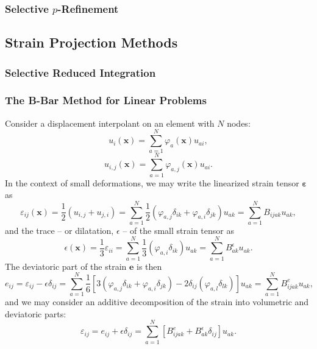 \documentclass[12pt]{book}
\begin{document}
\subsubsection{Selective $p$-Refinement}

\subsection{Strain Projection Methods}
\subsubsection{Selective Reduced Integration}
\subsubsection{The B-Bar Method for Linear Problems}

Consider a displacement interpolant on an element with $N$ nodes:
\begin{equation}
  u_i (\mathbf{x}) = \sum_{a = 1}^N \varphi_a (\mathbf{x}) u_{ai},
\end{equation}
\begin{equation}
  u_{i,j} (\mathbf{x}) = \sum_{a = 1}^N \varphi_{a,j} (\mathbf{x}) u_{ai}.
\end{equation}
In the context of small deformations, we may write the linearized strain tensor $\boldsymbol{\varepsilon}$ as
\begin{equation}
  \varepsilon_{ij} (\mathbf{x}) = \frac{1}{2} (u_{i,j} + u_{j,i}) = \sum_{a = 1}^N \frac{1}{2} (\varphi_{a,j} \delta_{ik} + \varphi_{a,i} \delta_{jk}) u_{ak} = \sum_{a = 1}^N B_{ijak} u_{ak},
\end{equation}
and the trace -- or dilatation, $\epsilon$ -- of the small strain tensor as
\begin{equation}
  \epsilon (\mathbf{x}) = \frac{1}{3} \varepsilon_{ii} = \sum_{a = 1}^N \frac{1}{3} (\varphi_{a,i} \delta_{ik}) u_{ak} = \sum_{a = 1}^N B^\epsilon_{ak} u_{ak}.
\end{equation}
The deviatoric part of the strain $\mathbf{e}$ is then
\begin{equation}
  e_{ij} = \varepsilon_{ij} - \epsilon \delta_{ij} = \sum_{a = 1}^N \frac{1}{6} \left[ 3(\varphi_{a,j} \delta_{ik} + \varphi_{a,i} \delta_{jk}) - 2 \delta_{ij} (\varphi_{a,l} \delta_{lk}) \right] u_{ak} = \sum_{a = 1}^N B^e_{ijak} u_{ak},
\end{equation}
and we may consider an additive decomposition of the strain into volumetric and deviatoric parts:
\begin{equation}
  \varepsilon_{ij} = e_{ij} + \epsilon \delta_{ij} = \sum_{a = 1}^N \left[ B^e_{ijak} + B^\epsilon_{ak} \delta_{ij} \right] u_{ak}.
\end{equation}
\end{document}
